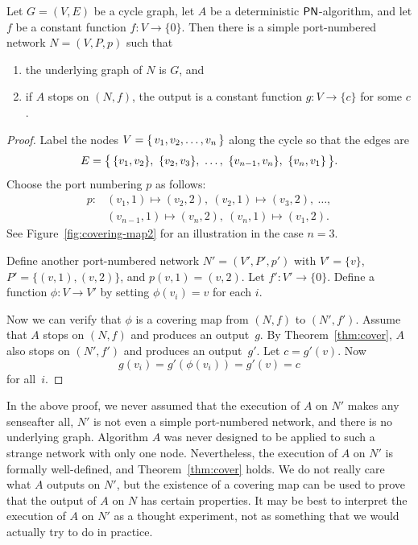 \begin{lemma}\label{lem:cycle-symmetric}
    Let $G = (V,E)$ be a cycle graph, let $A$ be a deterministic $\textup{\sffamily PN}$-algorithm, and let $f$ be a constant function $f\colon V \to \{0\}$. Then there is a simple port-numbered network $N = (V,P,p)$ such that
    \begin{enumerate}
        \item the underlying graph of $N$ is $G$, and
        \item if $A$ stops on $(N,f)$, the output is a constant function $g\colon V \to \{c\}$ for some $c$.
    \end{enumerate}
\end{lemma}
\begin{proof}
    Label the nodes $V = \{\,  v_1, v_2, \dotsc, v_n  \,\}$ along the cycle so that the edges are
    \[
        E = \bigSet{ \{v_1, v_2\},\ \{v_2, v_3\},\ \dotsc,\ \{v_{n-1}, v_n\},\ \{v_n, v_1\} }.
    \]
    Choose the port numbering $p$ as follows:
    \begin{align*}
        p\colon &(v_1, 1) \mapsto (v_2, 2),\ (v_2, 1) \mapsto (v_3, 2),\ \dotsc, \\
                &(v_{n-1}, 1) \mapsto (v_n, 2),\ (v_n, 1) \mapsto (v_1, 2).
    \end{align*}
    See Figure~\ref{fig:covering-map2} for an illustration in the case $n = 3$.
    
    Define another port-numbered network $N' = (V'\!,P'\!,p')$ with $V' = \{v\}$, $P' = \{ (v,1), (v,2) \}$, and $p(v,1) = (v,2)$. Let $f'\colon V' \to \{0\}$. Define a function $\phi\colon V \to V'$ by setting $\phi(v_i) = v$ for each $i$.
    
    Now we can verify that $\phi$ is a covering map from $(N,f)$ to $(N'\!,f')$. Assume that $A$ stops on $(N,f)$ and produces an output~$g$. By Theorem~\ref{thm:cover}, $A$ also stops on $(N'\!,f')$ and produces an output~$g'$. Let $c = g'(v)$. Now
    \[
        g(v_i) = g'(\phi(v_i)) = g'(v) = c
    \]
    for all~$i$.
\end{proof}

In the above proof, we never assumed that the execution of $A$ on $N'$ makes any sense\mydash after all, $N'$ is not even a simple port-numbered network, and there is no underlying graph. Algorithm $A$ was never designed to be applied to such a strange network with only one node. Nevertheless, the execution of $A$ on $N'$ is formally well-defined, and Theorem~\ref{thm:cover} holds. We do not really care what $A$ outputs on $N'$, but the existence of a covering map can be used to prove that the output of $A$ on $N$ has certain properties. It may be best to interpret the execution of $A$ on $N'$ as a thought experiment, not as something that we would actually try to do in practice.

